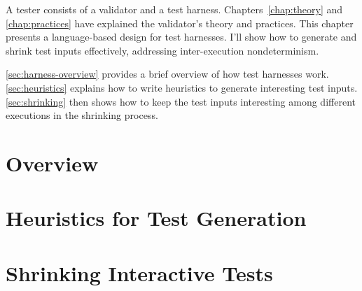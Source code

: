 A tester consists of a validator and a test harness.  Chapters~\ref{chap:theory}
and \ref{chap:practices} have explained the validator's theory and practices.
This chapter presents a language-based design for test harnesses.  I'll show how
to generate and shrink test inputs effectively, addressing inter-execution
nondeterminism.

\autoref{sec:harness-overview} provides a brief overview of how test harnesses
work.  \autoref{sec:heuristics} explains how to write heuristics to generate
interesting test inputs.  \autoref{sec:shrinking} then shows how to keep the
test inputs interesting among different executions in the shrinking process.

\section{Overview}
\label{sec:harness-overview}


\section{Heuristics for Test Generation}
\label{sec:heuristics}


\section{Shrinking Interactive Tests}
\label{sec:shrinking}

